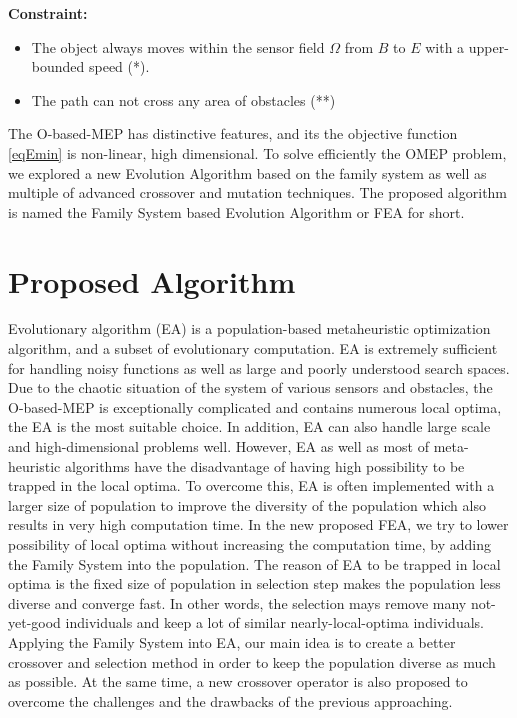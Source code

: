 \documentclass[final]{elsarticle}
\begin{document}
\textbf{Constraint:}	
\begin{itemize}
	\item The object always moves within the sensor field $\Omega $ from $B$ to $E$ with a upper-bounded speed (*).
	\item The path can not cross any area of obstacles  (**)
\end{itemize}
	
The O-based-MEP has distinctive features, and its the objective function \eqref{eqEmin} is non-linear, high dimensional. To solve efficiently the OMEP problem, we explored a new Evolution Algorithm based on the family system as well as multiple of advanced crossover and mutation techniques. The proposed algorithm is named the Family System based Evolution Algorithm or FEA for short.

\section{Proposed Algorithm}

Evolutionary algorithm (EA) is a population-based metaheuristic optimization algorithm, and a subset of evolutionary computation. EA is extremely sufficient for handling noisy functions as well as large and poorly understood search spaces. Due to the chaotic situation of the system of various sensors and obstacles, the O-based-MEP is exceptionally complicated and contains numerous local optima, the EA is the most suitable choice. In addition, EA can also handle large scale and high-dimensional problems well. However, EA as well as most of meta-heuristic algorithms have the disadvantage of having high possibility to be trapped in the local optima. To overcome this, EA is often implemented with a larger size of population to improve the diversity of the population which also results in very high computation time. In the new proposed FEA, we try to lower possibility of local optima without increasing the computation time, by adding the Family System into the population. The reason of EA to be trapped in local optima is the fixed size of population in selection step makes the population less diverse and converge fast. In other words, the selection mays remove many not-yet-good individuals and keep a lot of similar nearly-local-optima individuals. Applying the Family System into EA, our main idea is to create a better crossover and selection method in order to keep the population diverse as much as possible. At the same time, a new crossover operator is also proposed to overcome the challenges and the drawbacks of the previous approaching.
\end{document}
